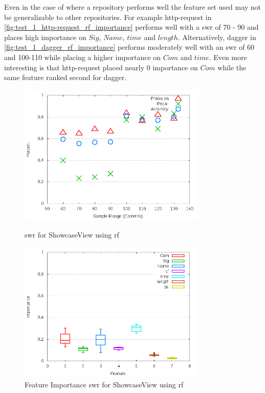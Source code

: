 Even in the case of where a repository performs well the feature set used may not be generalizable to other repositories. For example http-request in \autoref{fig:test_1_http-request_rf_importance} performs well with a \gls{swr} of 70 - 90 and places high importance on $Sig$, $Name$, $time$ and $length$. Alternatively, dagger in \autoref{fig:test_1_dagger_rf_importance} performs moderately well with an \gls{swr} of 60 and 100-110 while placing a higher importance on $Com$ and $time$. Even more interesting is that http-request placed nearly 0 importance on $Com$ while the same feature ranked second for dagger.

\begin{figure}[!ht]
    \centering
        \includegraphics[width=0.8\textwidth]{images/rf/test_1/ShowcaseView_sample_range}
        \caption{\gls{swr} for ShowcaseView using \gls{rf}}
        \label{fig:test_1_ShowcaseView_rf}

    \includegraphics[width=0.8\textwidth]{images/rf/test_1/ShowcaseView_importance}
        \caption{Feature Importance \gls{swr} for ShowcaseView using \gls{rf}}
        \label{fig:test_1_ShowcaseView_rf_importance}
\end{figure}

